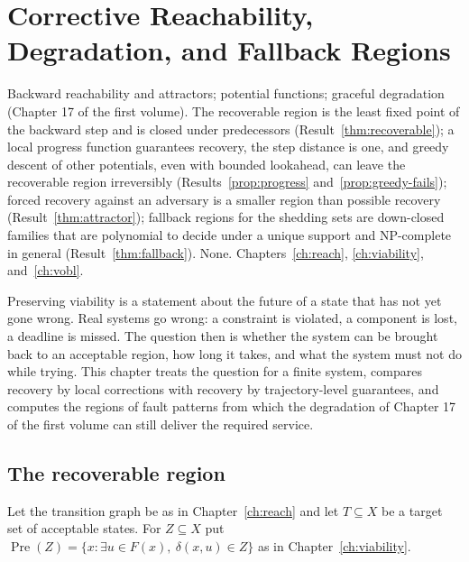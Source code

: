 \chapter[Corrective Reachability and Fallback Regions]{Corrective Reachability, Degradation, and Fallback Regions}\label{ch:fallback}
{Backward reachability and attractors; potential functions; graceful degradation (Chapter 17 of the first volume).}
{The recoverable region is the least fixed point of the backward step and is closed under predecessors (Result~\ref{thm:recoverable}); a local progress function guarantees recovery, the step distance is one, and greedy descent of other potentials, even with bounded lookahead, can leave the recoverable region irreversibly (Results~\ref{prop:progress} and~\ref{prop:greedy-fails}); forced recovery against an adversary is a smaller region than possible recovery (Result~\ref{thm:attractor}); fallback regions for the shedding sets are down-closed families that are polynomial to decide under a unique support and NP-complete in general (Result~\ref{thm:fallback}).}
{None.}
{Chapters~\ref{ch:reach}, \ref{ch:viability}, and~\ref{ch:vobl}.}

Preserving viability is a statement about the future of a state that has not yet gone wrong. Real systems go wrong: a constraint is violated, a component is lost, a deadline is missed. The question then is whether the system can be brought back to an acceptable region, how long it takes, and what the system must not do while trying. This chapter treats the question for a finite system, compares recovery by local corrections with recovery by trajectory-level guarantees, and computes the regions of fault patterns from which the degradation of Chapter 17 of the first volume can still deliver the required service.

\section{The recoverable region}

Let the transition graph be as in Chapter~\ref{ch:reach} and let $T\subseteq X$ be a target set of acceptable states. For $Z\subseteq X$ put $\operatorname{Pre}(Z)=\{x:\exists u\in F(x),\ \delta(x,u)\in Z\}$ as in Chapter~\ref{ch:viability}.

